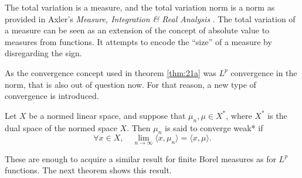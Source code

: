 The total variation is a measure, and the total variation norm is a norm as provided in Axler's \textit{Measure, Integration \& Real Analysis} \cite{axler_measure_2019}. The total variation of a measure can be seen as an extension of the concept of absolute value to measures from functions. It attempts to encode the ``size'' of a measure by disregarding the sign.

As the convergence concept used in theorem \ref{thm:21a} was $L^p$ convergence in the norm, that is also out of question now. For that reason, a new type of convergence is introduced.

\begin{definition}
    Let $X$ be a normed linear space, and suppose that $\mu_n,\mu\in X^*$, where $X^*$ is the dual space of the normed space $X$. Then $\mu_n$ is said to converge weak* if
    \begin{equation*}
        \forall x\in X,\quad\lim_{n\rightarrow\infty}\langle x,\mu_n\rangle=\langle x,\mu\rangle.
    \end{equation*}
\end{definition}

These are enough to acquire a similar result for finite Borel measures as for $L^p$ functions. The next theorem shows this result. 

